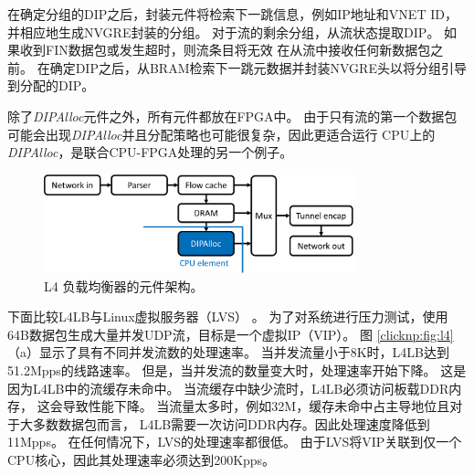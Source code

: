 在确定分组的DIP之后，封装元件将检索下一跳信息，例如IP地址和VNET ID，并相应地生成NVGRE封装的分组。
对于流的剩余分组，从流状态提取DIP。
如果收到FIN数据包或发生超时，则流条目将无效
在从流中接收任何新数据包之前。
在确定DIP之后，从BRAM检索下一跳元数据并封装NVGRE头以将分组引导到分配的DIP。

除了\textit {DIPAlloc}元件之外，所有元件都放在FPGA中。
由于只有流的第一个数据包可能会出现\textit {DIPAlloc}并且分配策略也可能很复杂，因此更适合运行
CPU上的\textit {DIPAlloc}，是联合CPU-FPGA处理的另一个例子。


\begin{figure}[htbp]
	\centering
	\includegraphics[width=0.8\textwidth]{image/L4LoadBalancer}
	\caption{L4 负载均衡器的元件架构。}
	\label{clicknp:fig:L4LB}
\end{figure}


下面比较L4LB与Linux虚拟服务器（LVS） \cite {lvs}。
为了对系统进行压力测试，使用64B数据包生成大量并发UDP流，目标是一个虚拟IP（VIP）。
图 \ref {clicknp:fig:l4}（a）显示了具有不同并发流数的处理速率。
当并发流量小于8K时，L4LB达到51.2Mpps的线路速率。
但是，当并发流的数量变大时，处理速率开始下降。
这是因为L4LB中的流缓存未命中。
当流缓存中缺少流时，L4LB必须访问板载DDR内存，
这会导致性能下降。
当流量太多时，例如32M，缓存未命中占主导地位且对于大多数数据包而言，
L4LB需要一次访问DDR内存。因此处理速度降低到11Mpps。
在任何情况下，LVS的处理速率都很低。
由于LVS将VIP关联到仅一个CPU核心，因此其处理速率必须达到200Kpps。

